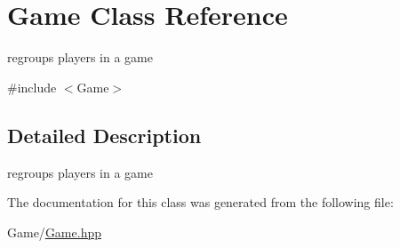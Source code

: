 \hypertarget{class_game}{}\section{Game Class Reference}
\label{class_game}


regroups players in a game  




{\ttfamily \#include $<$Game$>$}



\subsection{Detailed Description}
regroups players in a game 

The documentation for this class was generated from the following file\+:\begin{DoxyCompactItemize}
\item 
Game/\hyperlink{_game_8hpp}{Game.\+hpp}\end{DoxyCompactItemize}
